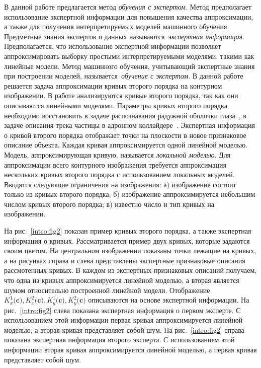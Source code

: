 \documentclass[12pt]{a&t}
\begin{document}
В данной работе предлагается метод \textit{обучения с экспертом}.
Метод предполагает использование экспертной информации для повышения качества аппроксимации, а также для получения интерпретируемых моделей машинного обучения.
Предметные знания экспертов о данных называются~\textit{экспертная информация}.
Предполагается, что использование экспертной информации позволяет аппроксимировать выборку простыми интерпретируемыми моделями, такими как линейные модели. Метод машинного обучения, учитывающий экспертные знания при построении моделей, называется~\textit{обучение с экспертом}.
В данной работе решается задача аппроксимации кривых второго порядка на контурном изображении.
В работе анализируются кривые второго порядка, так как они описываются линейными моделями. Параметры кривых второго порядка необходимо восстановить в задаче распознавания радужной оболочки глаза~\cite{Matveev2010, Matveev2014, Bowyer2010}, в задаче описания трека частицы в адронном коллайдере~\cite{Dalila2018}.
Экспертная информация о кривой второго порядка отображает точки на плоскости в новое признаковое описание объекта. 
Каждая кривая аппроксимируется одной линейной моделью.
Модель, аппроксимирующая кривую, называется \textit{локальной моделью}.
Для аппроксимации всего контурного изображения требуется аппроксимация нескольких кривых второго порядка с использованием локальных моделей.
Вводятся следующие ограничения на изображения: а) изображение состоит только из кривых второго порядка; б) изображение аппроксимируется небольшим числом кривых второго порядка; в) известно число и тип кривых на изображении.

На рис.~\ref{intro:fig2} показан пример кривых второго порядка, а также экспертная информация о кривых. Рассматривается пример двух кривых, которые задаются своим цветом. На центральном изображении показаны точки лежащие на кривых, а на рисунках справа и слева представлены экспертные признаковые описания рассмотенных кривых. В каждом из экспертных признаковых описаний получаем, что одна из кривых аппроксимируется линейной моделью, а вторая является шумом относительно построенной линейной модели. Отображение~$K_x^1\bigr(\mathbf{c}\bigr), K_x^2\bigr(\mathbf{c}\bigr), K_y^1\bigr(\mathbf{c}\bigr), K_y^2\bigr(\mathbf{c}\bigr)$ описываются на основе экспертной информации. На рис.~\ref{intro:fig2} слева показана экспертная информация о первом эксперте. С использованием этой информации первая кривая аппроксимируется линейной моделью, а вторая кривая представляет собой шум. На рис.~\ref{intro:fig2} справа показана экспертная информация второго эксперта. С использованием этой информации вторая кривая аппроксимируется линейной моделью, а первая кривая представляет собой шум.
\end{document}
